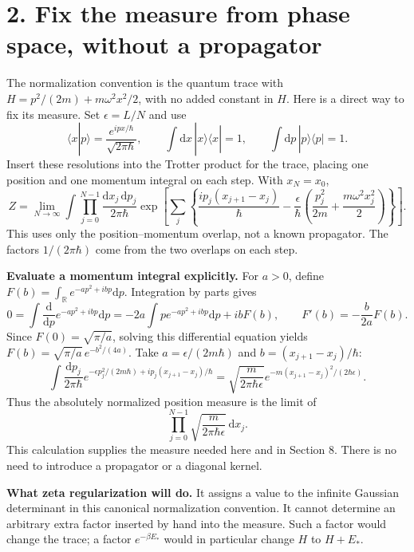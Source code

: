\documentclass[11pt,letterpaper]{article}
\newcommand{\dd}{\mathrm{d}}
\begin{document}
\newpage
\section*{2. Fix the measure from phase space, without a propagator}
The normalization convention is the quantum trace with
$H=p^2/(2m)+m\omega^2x^2/2$, with no added constant in $H$.
Here is a direct way to fix its measure. Set $\epsilon=L/N$ and use
\[
 \langle x|p\rangle=\frac{e^{ipx/\hbar}}{\sqrt{2\pi\hbar}},\qquad
 \int\dd x\,|x\rangle\langle x|=1,\qquad
 \int\dd p\,|p\rangle\langle p|=1.
\]
Insert these resolutions into the Trotter product for the trace, placing
one position and one momentum integral on each step. With $x_N=x_0$,
\begin{equation}
 Z=\lim_{N\to\infty}\int\prod_{j=0}^{N-1}
 \frac{\dd x_j\,\dd p_j}{2\pi\hbar}
 \exp\!\left[\sum_j\left\{
 \frac{i p_j(x_{j+1}-x_j)}{\hbar}
 -\frac{\epsilon}{\hbar}\left(\frac{p_j^2}{2m}
                   +\frac{m\omega^2x_j^2}{2}\right)\right\}\right].
 \label{eq:phase-space}
\end{equation}
This uses only the position--momentum overlap, not a known propagator.
The factors $1/(2\pi\hbar)$ come from the two overlaps on each step.

\textbf{Evaluate a momentum integral explicitly.}
For $a>0$, define $F(b)=\int_{\mathbb R}e^{-ap^2+ibp}\dd p$.
Integration by parts gives
\[
 0=\int\frac{\dd}{\dd p}e^{-ap^2+ibp}\dd p
 =-2a\int p e^{-ap^2+ibp}\dd p+ibF(b),
 \qquad F'(b)=-\frac{b}{2a}F(b).
\]
Since $F(0)=\sqrt{\pi/a}$, solving this differential equation yields
$F(b)=\sqrt{\pi/a}\,e^{-b^2/(4a)}$. Take
$a=\epsilon/(2m\hbar)$ and $b=(x_{j+1}-x_j)/\hbar$:
\begin{equation}
 \int\frac{\dd p_j}{2\pi\hbar}
 e^{-\epsilon p_j^2/(2m\hbar)+ip_j(x_{j+1}-x_j)/\hbar}
 =\sqrt{\frac{m}{2\pi\hbar\epsilon}}
 e^{-m(x_{j+1}-x_j)^2/(2\hbar\epsilon)}.
\end{equation}
Thus the absolutely normalized position measure is the limit of
\begin{equation}
 \boxed{\prod_{j=0}^{N-1}\sqrt{\frac{m}{2\pi\hbar\epsilon}}\,\dd x_j.}
 \label{eq:canonical-measure}
\end{equation}
This calculation supplies the measure needed here and in Section 8.
There is no need to introduce a propagator or a diagonal kernel.

\textbf{What zeta regularization will do.}
It assigns a value to the infinite Gaussian determinant in this canonical
normalization convention. It cannot determine an arbitrary extra factor
inserted by hand into the measure. Such a factor would change the trace;
a factor $e^{-\beta E_*}$ would in particular change $H$ to $H+E_*$.
\end{document}
